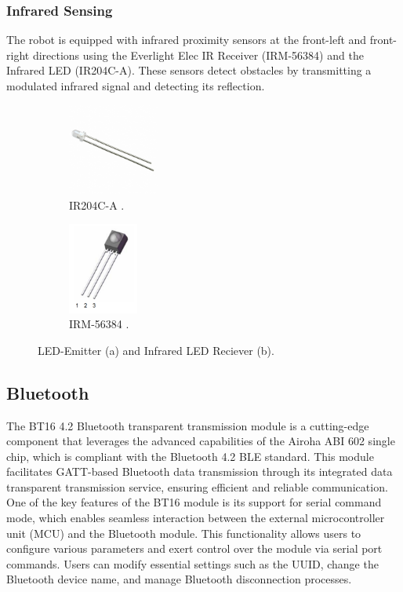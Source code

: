 \documentclass{article}
\begin{document}
\subsubsection{Infrared Sensing}
The robot is equipped with infrared proximity sensors at the front-left and front-right directions using the Everlight Elec IR Receiver (IRM-56384) and the Infrared LED (IR204C-A). These sensors detect obstacles by transmitting a modulated infrared signal and detecting its reflection.
\begin{figure}[H]
\begin{subfigure}{0.5\textwidth}
    \centering
    \includegraphics[height=3cm]{assets/HIR204C.jpg} 
    \caption{IR204C-A \cite{ir-led}.}
    \label{fig:ir-led}
\end{subfigure}
\begin{subfigure}{0.5\textwidth}
    \centering
    \includegraphics[height=3cm]{assets/ir-receiver.png} 
    \caption{IRM-56384 \cite{ir-receiver}.}
    \label{fig:ir-receiver}
\end{subfigure}
    \caption{LED-Emitter (a) and Infrared LED Reciever (b).} %
    \label{fig:ir-sensors}
\end{figure}

\subsection{Bluetooth}
The BT16 4.2 Bluetooth transparent transmission module is a cutting-edge component that leverages the advanced capabilities of the Airoha ABI 602 single chip, which is compliant with the Bluetooth 4.2 BLE standard. This module facilitates GATT-based Bluetooth data transmission through its integrated data transparent transmission service, ensuring efficient and reliable communication. One of the key features of the BT16 module is its support for serial command mode, which enables seamless interaction between the external microcontroller unit (MCU) and the Bluetooth module. This functionality allows users to configure various parameters and exert control over the module via serial port commands. Users can modify essential settings such as the UUID, change the Bluetooth device name, and manage Bluetooth disconnection processes. 
\end{document}
